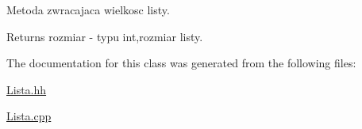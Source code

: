 Metoda zwracajaca wielkosc listy. 

\begin{DoxyReturn}{Returns}
rozmiar -\/ typu int,rozmiar listy. 
\end{DoxyReturn}


The documentation for this class was generated from the following files\+:\begin{DoxyCompactItemize}
\item 
\hyperlink{a00013}{Lista.\+hh}\item 
\hyperlink{a00012}{Lista.\+cpp}\end{DoxyCompactItemize}
